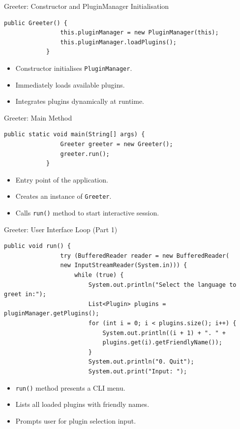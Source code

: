 \documentclass[aspectratio=169, table]{beamer}
\begin{document}
	\begin{frame}[fragile]{\LARGE{Greeter: Constructor and PluginManager Initialisation}}
		\vspace{20pt}
		\begin{lstlisting}[style=JavaStyle, inputencoding=utf8, basicstyle=\scriptsize\ttfamily]
			public Greeter() {
				this.pluginManager = new PluginManager(this);
				this.pluginManager.loadPlugins();
			}
		\end{lstlisting}
		
		\begin{itemize}
			\item Constructor initialises \texttt{PluginManager}.
			\item Immediately loads available plugins.
			\item Integrates plugins dynamically at runtime.
		\end{itemize}
	\end{frame}
	
	\begin{frame}[fragile]{Greeter: Main Method}
		\vspace{20pt}
		\begin{lstlisting}[style=JavaStyle, inputencoding=utf8, basicstyle=\scriptsize\ttfamily]
			public static void main(String[] args) {
				Greeter greeter = new Greeter();
				greeter.run();
			}
		\end{lstlisting}
		
		\begin{itemize}
			\item Entry point of the application.
			\item Creates an instance of \texttt{Greeter}.
			\item Calls \texttt{run()} method to start interactive session.
		\end{itemize}
	\end{frame}
	
	\begin{frame}[fragile]{Greeter: User Interface Loop (Part 1)}
		\vspace{20pt}
		\begin{lstlisting}[style=JavaStyle, inputencoding=utf8, basicstyle=\scriptsize\ttfamily]
			public void run() {
				try (BufferedReader reader = new BufferedReader(
				new InputStreamReader(System.in))) {
					while (true) {
						System.out.println("Select the language to greet in:");
						List<Plugin> plugins = pluginManager.getPlugins();
						for (int i = 0; i < plugins.size(); i++) {
							System.out.println((i + 1) + ". " + 
							plugins.get(i).getFriendlyName());
						}
						System.out.println("0. Quit");
						System.out.print("Input: ");
					\end{lstlisting}
					
					\begin{itemize}
						\item \texttt{run()} method presents a CLI menu.
						\item Lists all loaded plugins with friendly names.
						\item Prompts user for plugin selection input.
					\end{itemize}
				\end{frame}
				
\end{document}
